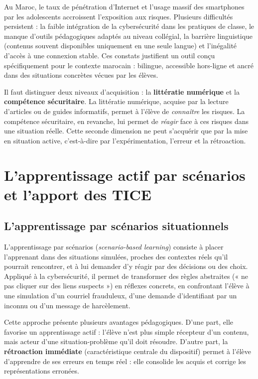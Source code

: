 \documentclass[12pt, a4paper, oneside]{report}
\begin{document}
Au Maroc, le taux de pénétration d'Internet et l'usage massif des smartphones par les adolescents accroissent l'exposition aux risques. Plusieurs difficultés persistent : la faible intégration de la cybersécurité dans les pratiques de classe, le manque d'outils pédagogiques adaptés au niveau collégial, la barrière linguistique (contenus souvent disponibles uniquement en une seule langue) et l'inégalité d'accès à une connexion stable. Ces constats justifient un outil conçu spécifiquement pour le contexte marocain : bilingue, accessible hors-ligne et ancré dans des situations concrètes vécues par les élèves.

Il faut distinguer deux niveaux d'acquisition : la \textbf{littératie numérique} et la \textbf{compétence sécuritaire}. La littératie numérique, acquise par la lecture d'articles ou de guides informatifs, permet à l'élève de \textit{connaître} les risques. La compétence sécuritaire, en revanche, lui permet de \textit{réagir} face à ces risques dans une situation réelle. Cette seconde dimension ne peut s'acquérir que par la mise en situation active, c'est-à-dire par l'expérimentation, l'erreur et la rétroaction.

\section{L'apprentissage actif par scénarios et l'apport des TICE}

\subsection{L'apprentissage par scénarios situationnels}
L'apprentissage par scénarios (\textit{scenario-based learning}) consiste à placer l'apprenant dans des situations simulées, proches des contextes réels qu'il pourrait rencontrer, et à lui demander d'y réagir par des décisions ou des choix. Appliqué à la cybersécurité, il permet de transformer des règles abstraites (« ne pas cliquer sur des liens suspects ») en réflexes concrets, en confrontant l'élève à une simulation d'un courriel frauduleux, d'une demande d'identifiant par un inconnu ou d'un message de harcèlement.

Cette approche présente plusieurs avantages pédagogiques. D'une part, elle favorise un apprentissage actif : l'élève n'est plus simple récepteur d'un contenu, mais acteur d'une situation-problème qu'il doit résoudre. D'autre part, la \textbf{rétroaction immédiate} (caractéristique centrale du dispositif) permet à l'élève d'apprendre de ses erreurs en temps réel : elle consolide les acquis et corrige les représentations erronées.
\end{document}
